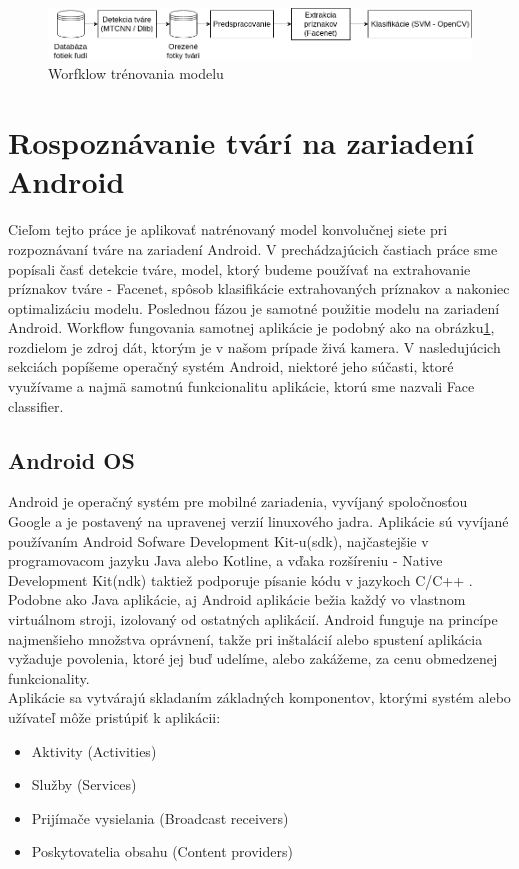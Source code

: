 \begin{figure}[H]
	\centering
	\includegraphics[width=1\linewidth]{img/trainig_workflow}
	\caption{Worfklow trénovania modelu}
	\label{fig:trainig_workflow}
\end{figure}

\newpage 

\section{Rospoznávanie tvárí na zariadení Android}\label{l:andapp}
Cieľom tejto práce je aplikovať natrénovaný model konvolučnej siete pri rozpoznávaní tváre na zariadení Android.
V prechádzajúcich častiach práce sme popísali časť detekcie tváre, model, ktorý budeme používať na extrahovanie príznakov tváre - Facenet, spôsob klasifikácie extrahovaných príznakov a nakoniec optimalizáciu modelu.
Poslednou fázou je samotné použitie modelu na zariadení Android.
Workflow fungovania samotnej aplikácie je podobný ako na obrázku\ref{fig:trainig_workflow}, rozdielom je zdroj dát, ktorým je v našom prípade živá kamera.
V nasledujúcich sekciách popíšeme operačný systém Android, niektoré jeho súčasti, ktoré využívame a najmä samotnú funkcionalitu aplikácie, ktorú sme nazvali Face classifier.

\subsection{Android OS}
Android je operačný systém pre mobilné zariadenia, vyvíjaný spoločnosťou Google a je postavený na upravenej verzií linuxového jadra.
Aplikácie sú vyvíjané používaním Android Sofware Development Kit-u(\acrshort{sdk}), najčastejšie v programovacom jazyku Java alebo Kotline, a vďaka rozšíreniu - Native Development Kit(\acrshort{ndk}) taktiež podporuje písanie kódu v jazykoch C/C++ \cite{Applicat21}.
Podobne ako Java aplikácie, aj Android aplikácie bežia každý vo vlastnom virtuálnom stroji, izolovaný od ostatných aplikácií.
Android funguje na princípe najmenšieho množstva oprávnení, takže pri inštalácií alebo spustení aplikácia vyžaduje povolenia, ktoré jej buď udelíme, alebo zakážeme, za cenu obmedzenej funkcionality. \\

\indent Aplikácie sa vytvárajú skladaním základných komponentov, ktorými systém alebo užívateľ môže pristúpiť k aplikácii:
\begin{itemize}
	\item Aktivity (Activities)
	\item Služby (Services)
	\item Prijímače vysielania (Broadcast receivers)
	\item Poskytovatelia obsahu (Content providers)
\end{itemize}
\cite{Applicat21}

